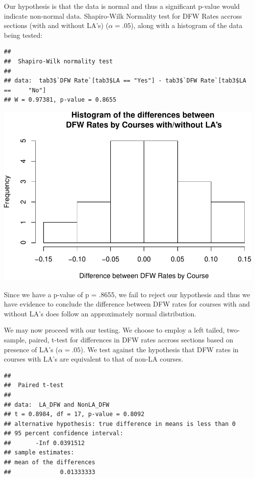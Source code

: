 \documentclass[]{article}
\begin{document}
Our hypothesis is that the data is normal and thus a significant p-value
would indicate non-normal data. Shapiro-Wilk Normality test for DFW
Rates accross sections (with and without LA's) (\(\alpha = .05\)), along
with a histogram of the data being tested:

\begin{verbatim}
## 
##  Shapiro-Wilk normality test
## 
## data:  tab3$`DFW Rate`[tab3$LA == "Yes"] - tab3$`DFW Rate`[tab3$LA ==     "No"]
## W = 0.97381, p-value = 0.8655
\end{verbatim}

\includegraphics{./tex2pdf.-c1091a137b26069e/b93c8366305c29630c969a7163cce6008d4d0cd9.pdf}

Since we have a p-value of p = .8655, we fail to reject our hypothesis
and thus we have evidence to conclude the difference between DFW rates
for courses with and without LA's does follow an approximately normal
distribution.

We may now proceed with our testing. We choose to employ a left tailed,
two-sample, paired, t-test for differences in DFW rates accross sections
based on presence of LA's (\(\alpha = .05\)). We test against the
hypothesis that DFW rates in courses with LA's are equivalent to that of
non-LA courses.

\begin{verbatim}
## 
##  Paired t-test
## 
## data:  LA_DFW and NonLA_DFW
## t = 0.8984, df = 17, p-value = 0.8092
## alternative hypothesis: true difference in means is less than 0
## 95 percent confidence interval:
##       -Inf 0.0391512
## sample estimates:
## mean of the differences 
##              0.01333333
\end{verbatim}
\end{document}
